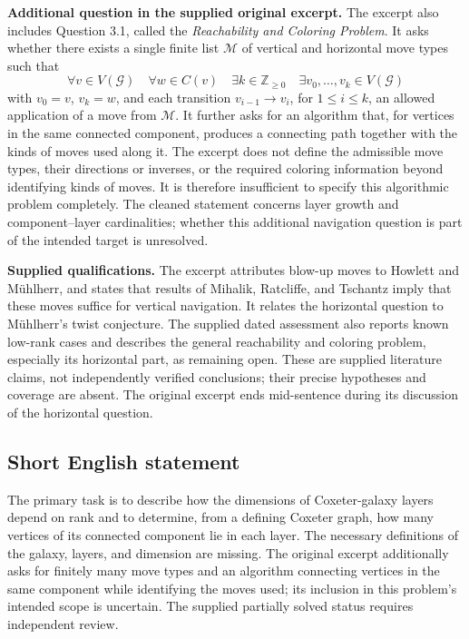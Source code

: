 \documentclass[11pt]{article}
\newcommand{\Z}{\mathbb{Z}}
\begin{document}
\textbf{Additional question in the supplied original excerpt.} The excerpt also includes Question 3.1, called the \emph{Reachability and Coloring Problem}. It asks whether there exists a single finite list \(\mathcal M\) of vertical and horizontal move types such that
\[
\forall v\in V(\mathcal G)\quad
\forall w\in C(v)\quad
\exists k\in\Z_{\geq 0}\quad
\exists v_0,\ldots,v_k\in V(\mathcal G)
\]
with \(v_0=v\), \(v_k=w\), and each transition \(v_{i-1}\to v_i\), for \(1\leq i\leq k\), an allowed application of a move from \(\mathcal M\). It further asks for an algorithm that, for vertices in the same connected component, produces a connecting path together with the kinds of moves used along it. The excerpt does not define the admissible move types, their directions or inverses, or the required coloring information beyond identifying kinds of moves. It is therefore insufficient to specify this algorithmic problem completely. The cleaned statement concerns layer growth and component--layer cardinalities; whether this additional navigation question is part of the intended target is unresolved.

\textbf{Supplied qualifications.} The excerpt attributes blow-up moves to Howlett and Mühlherr, and states that results of Mihalik, Ratcliffe, and Tschantz imply that these moves suffice for vertical navigation. It relates the horizontal question to Mühlherr's twist conjecture. The supplied dated assessment also reports known low-rank cases and describes the general reachability and coloring problem, especially its horizontal part, as remaining open. These are supplied literature claims, not independently verified conclusions; their precise hypotheses and coverage are absent. The original excerpt ends mid-sentence during its discussion of the horizontal question.
\subsection{Short English statement}
The primary task is to describe how the dimensions of Coxeter-galaxy layers depend on rank and to determine, from a defining Coxeter graph, how many vertices of its connected component lie in each layer. The necessary definitions of the galaxy, layers, and dimension are missing. The original excerpt additionally asks for finitely many move types and an algorithm connecting vertices in the same component while identifying the moves used; its inclusion in this problem's intended scope is uncertain. The supplied partially solved status requires independent review.
\end{document}
